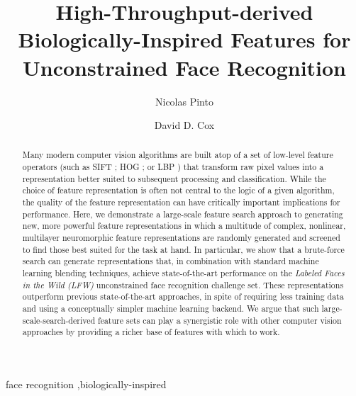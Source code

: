 \documentclass[preprint, 12pt]{elsarticle}
\begin{document}
\begin{frontmatter}

\title{
High-Throughput-derived Biologically-Inspired Features for Unconstrained Face Recognition
}

\author[rowland,mit]{Nicolas Pinto}

\author[rowland]{David D. Cox}

\address[rowland]{The Rowland Institute at Harvard, Harvard University, Cambridge, MA 02142}
\address[mit]{McGovern Institute for Brain Science at MIT, Cambridge, MA 02139}


\begin{abstract}
Many modern computer vision algorithms are built atop of a set of low-level
feature operators (such as SIFT \cite{sift,luo2007person}; HOG \cite{dalal2005hog,albiol2008face}; or LBP
\cite{ahonen2004face,ahonen2006face}) that transform raw pixel values into a representation better
suited to subsequent processing and classification.  While the choice of feature
representation is often not central to the logic of a given algorithm, the
quality of the feature representation can have critically important implications
for performance.  Here, we demonstrate a large-scale feature search approach to
generating new, more powerful feature representations in which a multitude of
complex, nonlinear, multilayer neuromorphic feature representations are randomly
generated and screened to find those best suited for the task at hand.  In
particular, we show that a brute-force search can generate representations that,
in combination with standard machine learning blending techniques, achieve
state-of-the-art performance on the \emph{Labeled Faces in the Wild (LFW)} \cite{huang:lfw}
unconstrained face recognition challenge set.  These representations outperform
previous state-of-the-art approaches, in spite of requiring less training data
and using a conceptually simpler machine learning backend.  We argue that such
large-scale-search-derived feature sets can play a synergistic role with other
computer vision approaches by providing a richer base of features with which to
work.

\end{abstract}

\begin{keyword}
face recognition \sep biologically-inspired
\end{keyword}

\end{frontmatter}
\end{document}
